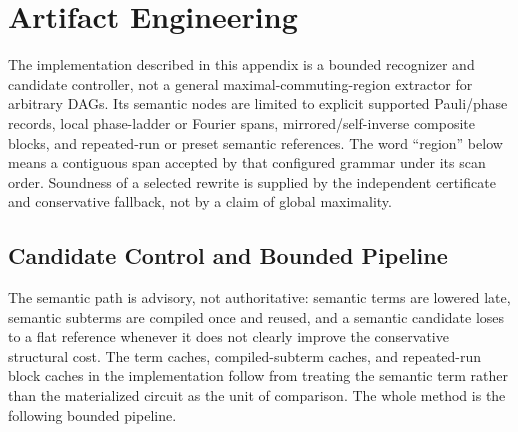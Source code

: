 \section{Artifact Engineering}
The implementation described in this appendix is a bounded recognizer and
candidate controller, not a general maximal-commuting-region extractor for
arbitrary DAGs.  Its semantic nodes are limited to explicit supported
Pauli/phase records, local phase-ladder or Fourier spans,
mirrored/self-inverse composite blocks, and repeated-run or preset semantic
references.  The word ``region'' below means a contiguous span accepted by
that configured grammar under its scan order.  Soundness of a selected
rewrite is supplied by the independent certificate and conservative
fallback, not by a claim of global maximality.

\subsection{Candidate Control and Bounded Pipeline}

The semantic path is advisory, not authoritative: semantic terms are
lowered late, semantic subterms are compiled once and reused, and a
semantic candidate loses to a flat reference whenever it does not
clearly improve the conservative structural cost.  The term caches,
compiled-subterm caches, and repeated-run block caches in the
implementation follow from treating the semantic term rather than the
materialized circuit as the unit of comparison.  The whole method is the
following bounded pipeline.

